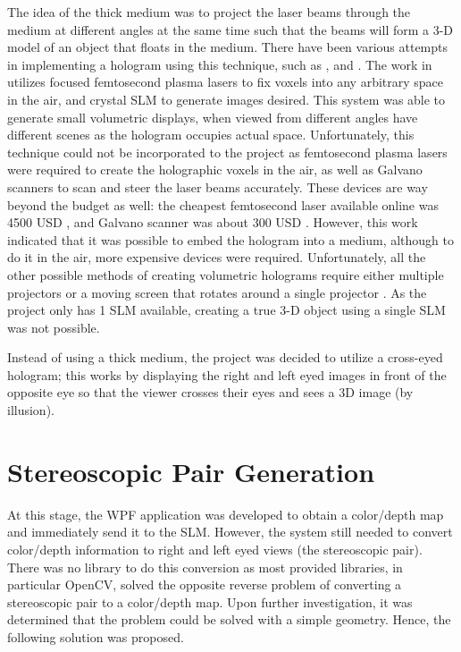 \documentclass[12pt]{article}
\begin{document}
The idea of the thick medium was to project the laser beams through the medium at different angles at the same time such that the beams will form a 3-D model of an object that floats in the medium. There have been various attempts in implementing a hologram using this technique, such as \cite{ochiai2015fairy}, and \cite{sano2017holography}. The work in \cite{ochiai2015fairy} utilizes focused femtosecond plasma lasers to fix voxels into any arbitrary space in the air, and crystal SLM to generate images desired. This system was able to generate small volumetric displays, when viewed from different angles have different scenes as the hologram occupies actual space. Unfortunately, this technique could not be incorporated to the project as femtosecond plasma lasers were required to create the holographic voxels in the air, as well as Galvano scanners to scan and steer the laser beams accurately. These devices are way beyond the budget as well: the cheapest femtosecond laser available online was 4500 USD \cite{Femto}, and Galvano scanner was about 300 USD \cite{Galvano}. However, this work indicated that it was possible to embed the hologram into a medium, although to do it in the air, more expensive devices were required. Unfortunately, all the other possible methods of creating volumetric holograms require either multiple projectors or a moving screen that rotates around a single projector \cite{sano2017holography}. As the project only has 1 SLM available, creating a true 3-D object using a single SLM was not possible.

Instead of using a thick medium, the project was decided to utilize a cross-eyed hologram; this works by displaying the right and left eyed images in front of the opposite eye so that the viewer crosses their eyes and sees a 3D image (by illusion).

\section{Stereoscopic Pair Generation}

At this stage, the WPF application was developed to obtain a color/depth map and immediately send it to the SLM. However, the system still needed to convert color/depth information to right and left eyed views (the stereoscopic pair). There was no library to do this conversion as most provided libraries, in particular OpenCV, solved the opposite reverse problem of converting a stereoscopic pair to a color/depth map. Upon further investigation, it was determined that the problem could be solved with a simple geometry. Hence, the following solution was proposed.
\end{document}
